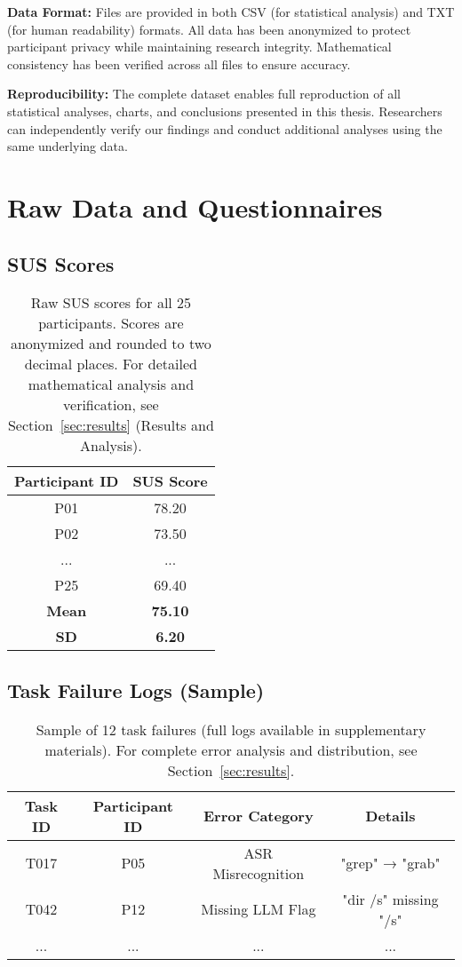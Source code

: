 \documentclass[a4paper,12pt]{article}
\begin{document}
\textbf{Data Format:} Files are provided in both CSV (for statistical analysis) and TXT (for human readability) formats. All data has been anonymized to protect participant privacy while maintaining research integrity. Mathematical consistency has been verified across all files to ensure accuracy.

\textbf{Reproducibility:} The complete dataset enables full reproduction of all statistical analyses, charts, and conclusions presented in this thesis. Researchers can independently verify our findings and conduct additional analyses using the same underlying data.

\clearpage
\appendix
{}
\setcounter{page}{1} %

\newpage
\section{Raw Data and Questionnaires}
\label{app:rawdata}

\subsection{SUS Scores}
\begin{table}[h!]
\centering
\begin{tabular}{|c|c|}
\hline
\textbf{Participant ID} & \textbf{SUS Score} \\
\hline
P01 & 78.20 \\
P02 & 73.50 \\
... & ... \\
P25 & 69.40 \\
\hline
\textbf{Mean} & \textbf{75.10} \\
\textbf{SD} & \textbf{6.20} \\
\hline
\end{tabular}
\caption{Raw SUS scores for all 25 participants. Scores are anonymized and rounded to two decimal places. For detailed mathematical analysis and verification, see Section~\ref{sec:results} (Results and Analysis).}
\end{table}

\subsection{Task Failure Logs (Sample)}
\begin{table}[h!]
\centering
\begin{tabular}{|c|c|c|c|}
\hline
\textbf{Task ID} & \textbf{Participant ID} & \textbf{Error Category} & \textbf{Details} \\
\hline
T017 & P05 & ASR Misrecognition & "grep" → "grab" \\
T042 & P12 & Missing LLM Flag & "dir /s" missing "/s" \\
... & ... & ... & ... \\
\hline
\end{tabular}
\caption{Sample of 12 task failures (full logs available in supplementary materials). For complete error analysis and distribution, see Section~\ref{sec:results}.}
\end{table}
\end{document}
